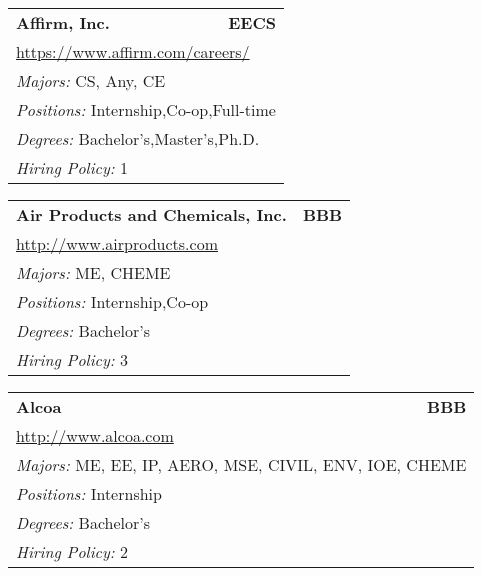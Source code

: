 \documentclass[twoside]{article}
\begin{document}
\begin{center}
\begin{multicols}{3}
\begin{FlushLeft}
\begin{minipage}{.9\columnwidth}
\end{minipage}
 
\begin{minipage}{.9\columnwidth}\begin{tabularx}{.95\columnwidth}{Xr}
                 {\Large\bf Affirm, Inc.} & {\Large\bf EECS}\\
    \multicolumn{2}{p{.95\columnwidth}}{\url{https://www.affirm.com/careers/}}\\
    \multicolumn{2}{p{.95\columnwidth}}{\emph{Majors:} CS, Any, CE}\\
    \multicolumn{2}{p{.95\columnwidth}}{\emph{Positions:} Internship,Co-op,Full-time}\\
    \multicolumn{2}{p{.95\columnwidth}}{\emph{Degrees:} Bachelor's,Master's,Ph.D.}\\
    \multicolumn{2}{p{.95\columnwidth}}{\emph{Hiring Policy:} 1}\\
    \end{tabularx}
    
\end{minipage}
 
\begin{minipage}{.9\columnwidth}\begin{tabularx}{.95\columnwidth}{Xr}
                 {\Large\bf Air Products and Chemicals, Inc.} & {\Large\bf BBB}\\
    \multicolumn{2}{p{.95\columnwidth}}{\url{http://www.airproducts.com}}\\
    \multicolumn{2}{p{.95\columnwidth}}{\emph{Majors:} ME, CHEME}\\
    \multicolumn{2}{p{.95\columnwidth}}{\emph{Positions:} Internship,Co-op}\\
    \multicolumn{2}{p{.95\columnwidth}}{\emph{Degrees:} Bachelor's}\\
    \multicolumn{2}{p{.95\columnwidth}}{\emph{Hiring Policy:} 3}\\
    \end{tabularx}
    
\end{minipage}
 
\begin{minipage}{.9\columnwidth}\begin{tabularx}{.95\columnwidth}{Xr}
                 {\Large\bf Alcoa} & {\Large\bf BBB}\\
    \multicolumn{2}{p{.95\columnwidth}}{\url{http://www.alcoa.com}}\\
    \multicolumn{2}{p{.95\columnwidth}}{\emph{Majors:} ME, EE, IP, AERO, MSE, CIVIL, ENV, IOE, CHEME}\\
    \multicolumn{2}{p{.95\columnwidth}}{\emph{Positions:} Internship}\\
    \multicolumn{2}{p{.95\columnwidth}}{\emph{Degrees:} Bachelor's}\\
    \multicolumn{2}{p{.95\columnwidth}}{\emph{Hiring Policy:} 2}\\
    \end{tabularx}
    

\end{minipage}
\end{FlushLeft}
\end{multicols}
\end{center}
\end{document}
